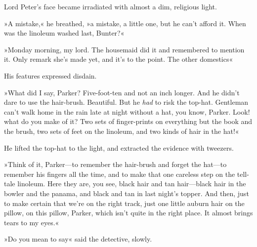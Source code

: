 Lord Peter's face became irradiated with almost a dim, religious light.

»A mistake,« he breathed, »a mistake, a little one, but he can't afford it. When was the linoleum washed last, Bunter?«

»Monday morning, my lord. The housemaid did it and remembered to mention it. Only remark she's made yet, and it's to the point. The other domestics\longdash«

His features expressed disdain.

»What did I say, Parker? Five-foot-ten and not an inch longer. And he didn't dare to use the hair-brush. Beautiful. But he \textit{had} to risk the top-hat. Gentleman can't walk home in the rain late at night without a hat, you know, Parker. Look! what do you make of it? Two sets of finger-prints on everything but the book and the brush, two sets of feet on the linoleum, and two kinds of hair in the hat!«

He lifted the top-hat to the light, and extracted the evidence with tweezers.

»Think of it, Parker\allowbreak---\allowbreak to remember the hair-brush and forget the hat\allowbreak---\allowbreak to remember his fingers all the time, and to make that one careless step on the tell-tale linoleum. Here they are, you see, black hair and tan hair\allowbreak---\allowbreak black hair in the bowler and the panama, and black and tan in last night's topper. And then, just to make certain that we're on the right track, just one little auburn hair on the pillow, on this pillow, Parker, which isn't quite in the right place. It almost brings tears to my eyes.«

»Do you mean to say\longdash« said the detective, slowly.

